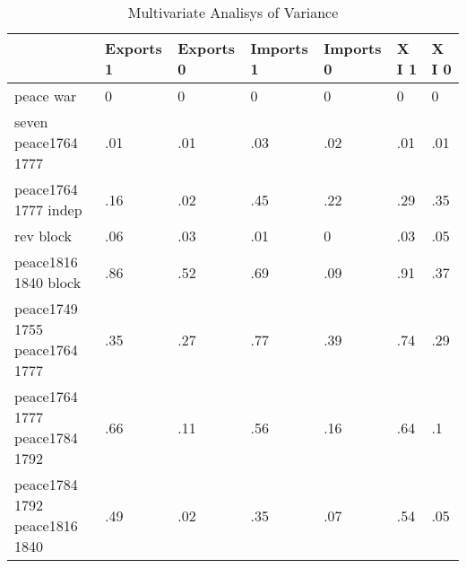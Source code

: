 \begin{table}[htbp]
\caption{\label{tab:manova_test_sitc} Multivariate Analisys of Variance}\centering\medskip
\begin{tabular}{|l|l|l|l|l|l|l|}\hline  
 & Exports 1  & Exports 0  & Imports 1  & Imports 0  & X I 1  & X I 0  \\ \hline  
peace war & 0 & 0 & 0 & 0 & 0 & 0 \\ \hline 
seven peace1764 1777 & .01 & .01 & .03 & .02 & .01 & .01 \\ \hline 
peace1764 1777 indep & .16 & .02 & .45 & .22 & .29 & .35 \\ \hline 
rev block & .06 & .03 & .01 & 0 & .03 & .05 \\ \hline 
peace1816 1840 block & .86 & .52 & .69 & .09 & .91 & .37 \\ \hline 
peace1749 1755 peace1764 1777 & .35 & .27 & .77 & .39 & .74 & .29 \\ \hline 
peace1764 1777 peace1784 1792 & .66 & .11 & .56 & .16 & .64 & .1 \\ \hline 
peace1784 1792 peace1816 1840 & .49 & .02 & .35 & .07 & .54 & .05 \\ \hline 
  \end{tabular}
\end{table}

